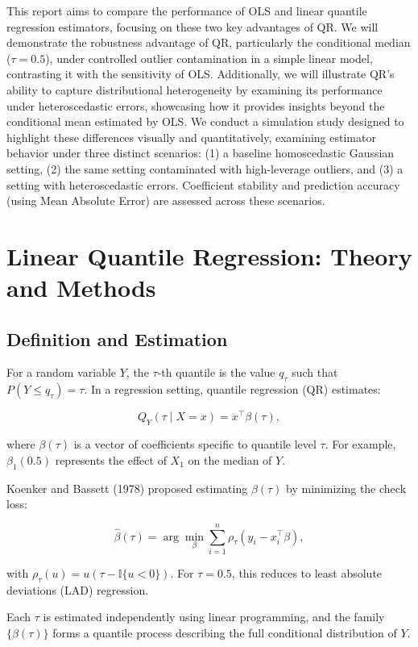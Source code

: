 \documentclass[fleqn,10pt]{latex/stylish_article} %
\begin{document}
This report aims to compare the performance of OLS and linear quantile regression estimators, focusing on these two key advantages of QR. We will demonstrate the robustness advantage of QR, particularly the conditional median (\(\tau=0.5\)), under controlled outlier contamination in a simple linear model, contrasting it with the sensitivity of OLS. Additionally, we will illustrate QR's ability to capture distributional heterogeneity by examining its performance under heteroscedastic errors, showcasing how it provides insights beyond the conditional mean estimated by OLS. We conduct a simulation study designed to highlight these differences visually and quantitatively, examining estimator behavior under three distinct scenarios: (1) a baseline homoscedastic Gaussian setting, (2) the same setting contaminated with high-leverage outliers, and (3) a setting with heteroscedastic errors. Coefficient stability and prediction accuracy (using Mean Absolute Error) are assessed across these scenarios.

\section{Linear Quantile Regression: Theory and Methods}\label{linear-quantile-regression-theory-and-methods}

\subsection{Definition and Estimation}\label{definition-and-estimation}

For a random variable \(Y\), the \(\tau\)-th quantile is the value \(q_\tau\) such that \(P(Y \le q_\tau) = \tau\). In a regression setting, quantile regression (QR) estimates:

\[
Q_Y(\tau \mid X = x) = x^\top \beta(\tau),
\]

where \(\beta(\tau)\) is a vector of coefficients specific to quantile level \(\tau\). For example, \(\beta_1(0.5)\) represents the effect of \(X_1\) on the median of \(Y\).

Koenker and Bassett (1978) proposed estimating \(\beta(\tau)\) by minimizing the check loss:

\[
\hat\beta(\tau) = \arg\min_\beta \sum_{i=1}^n \rho_\tau(y_i - x_i^\top \beta),
\]

with \(\rho_\tau(u) = u(\tau - \mathbb{I}\{u < 0\})\). For \(\tau = 0.5\), this reduces to least absolute deviations (LAD) regression.

Each \(\tau\) is estimated independently using linear programming, and the family \(\{\beta(\tau)\}\) forms a quantile process describing the full conditional distribution of \(Y\).
\end{document}
